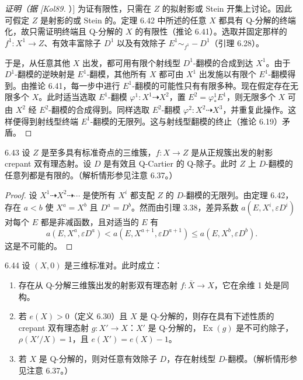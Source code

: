 \begin{proof}[证明（据 [Kol89]）]
为证有限性，只需在 $Z$ 的拟射影或 Stein 开集上讨论。因此可假定 $Z$ 是射影的或 Stein 的。定理 6.42 中所述的任意 $X$ 都具有 Q-分解的终端化，故只需证明终端且 Q-分解的 $X$ 的有限性（推论 6.41）。选取并固定那样的 $f^1:X^1\to Z$、有效丰富除子 $D^1$ 以及有效除子 $E^1\sim_{f^1}-D^1$（引理 6.28）。

于是，从任意其他 $X$ 出发，都可用有限个射线型 $D^1$-翻模的合成到达 $X^1$。由于 $D^1$-翻模的逆映射是 $E^1$-翻模，其他所有 $X$ 都可由 $X^1$ 出发施以有限个 $E^1$-翻模得到。由推论 6.41，每一步中进行 $E^1$-翻模的可能性只有有限多种。现在假定存在无限多个 $X$。此时适当选取 $E^1$-翻模 $\varphi^1:X^1\dashrightarrow X^2$，置 $E^2=\varphi^1_*E^1$，则无限多个 $X$ 可由 $X^2$ 经 $E^2$-翻模的合成得到。同样选取 $E^2$-翻模 $\varphi^2:X^2\dashrightarrow X^3$，并重复此操作。这样便得到射线型终端 $E^1$-翻模的无限列。这与射线型翻模的终止（推论 6.19）矛盾。
\end{proof}

\begin{theorem*}[三维标准翻模的终止定理（简版）]{6.43}
设 $Z$ 是至多具有标准奇点的三维簇，$f:X\to Z$ 是从正规簇出发的射影 crepant 双有理态射。设 $D$ 是有效且 Q-Cartier 的 Q-除子。此时 $Z$ 上 $D$-翻模的任意列都是有限的。（解析情形参见注意 6.37。）
\end{theorem*}

\begin{proof}
设 $X^1\dashrightarrow X^2\dashrightarrow\cdots$ 是使所有 $X^i$ 都支配 $Z$ 的 $D$-翻模的无限列。由定理 6.42，存在 $a<b$ 使 $X^a=X^b$ 且 $D^a=D^b$。然而由引理 3.38，差异系数 $a(E,X^i,\varepsilon D^i)$ 对每个 $E$ 都是非减函数，且对适当的 $E$ 有
\[
a(E,X^a,\varepsilon D^a)<a(E,X^{a+1},\varepsilon D^{a+1})\le a(E,X^b,\varepsilon D^b).
\]
这是不可能的。
\end{proof}


\begin{theoremp}{6.44}
设 $(X,0)$ 是三维标准对。此时成立：
\begin{enumerate}[label=（\arabic*）,leftmargin=3.2em]
\item 存在从 Q-分解三维簇出发的射影双有理态射 $f:\bar X\to X$，它在余维 1 处是同构。
\item 若 $e(X)>0$（定义 6.30）且 $X$ 是 Q-分解的，则存在具有下述性质的 crepant 双有理态射 $g:X'\to X$：$X'$ 是 Q-分解的，$\operatorname{Ex}(g)$ 是不可约除子，$\rho(X'/X)=1$，且 $e(X')=e(X)-1$。
\item 若 $X$ 是 Q-分解的，则对任意有效除子 $D$，存在射线型 $D$-翻模。（解析情形参见注意 6.37。）
\end{enumerate}
\end{theoremp}

